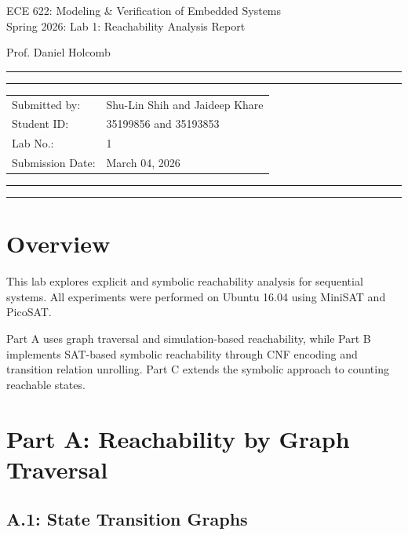 \documentclass[10pt]{article}
\newcommand{\studentname}{Shu-Lin Shih and Jaideep Khare}
\newcommand{\studentnumber}{35199856 and 35193853}
\newcommand{\coursename}{ECE 622: Modeling \& Verification of Embedded Systems}
\newcommand{\semester}{Spring 2026}
\begin{document}
\begin{center}
{\huge{\coursename}} \\
\vspace{2mm}
{\Large{\semester: Lab 1: Reachability Analysis Report}}

\vspace{1mm}
{\Large{Prof. Daniel Holcomb}}
\end{center}

\vspace{5mm}
\hrule
\vspace{1mm}
\hrule

\vspace{3mm}
\begin{tabular}{ll}
Submitted by:  & {\studentname} \\
Student ID:     & {\studentnumber} \\
Lab No.:        & 1 \\
Submission Date:& March 04, 2026 \\
\end{tabular}

\vspace{3mm}
\hrule
\vspace{1mm}
\hrule

\section*{Overview}

This lab explores explicit and symbolic reachability analysis for sequential systems. 
All experiments were performed on Ubuntu 16.04 using MiniSAT and PicoSAT.

Part A uses graph traversal and simulation-based reachability, while Part B implements SAT-based symbolic reachability through CNF encoding and transition relation unrolling. Part C extends the symbolic approach to counting reachable states.


\section{Part A: Reachability by Graph Traversal}

\subsection*{A.1: State Transition Graphs}
\end{document}
